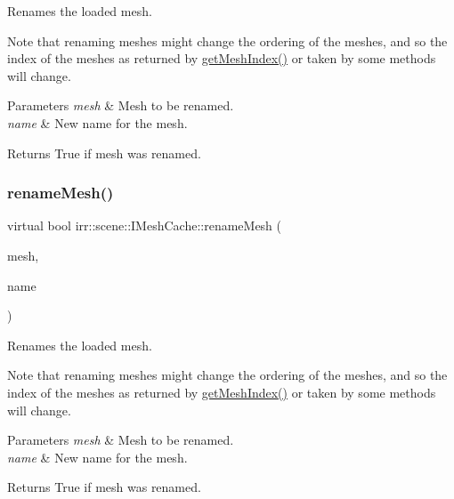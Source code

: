 Renames the loaded mesh. 

Note that renaming meshes might change the ordering of the meshes, and so the index of the meshes as returned by \hyperlink{classirr_1_1scene_1_1IMeshCache_a2b3512bd3ff11d0b290fa5d2d580eb54}{get\+Mesh\+Index()} or taken by some methods will change. 
\begin{DoxyParams}{Parameters}
{\em mesh} & Mesh to be renamed. \\
\hline
{\em name} & New name for the mesh. \\
\hline
\end{DoxyParams}
\begin{DoxyReturn}{Returns}
True if mesh was renamed. 
\end{DoxyReturn}
\mbox{\label{classirr_1_1scene_1_1IMeshCache_a4533c81f4f3df112fa106d6fb1118f3b}} 
\subsubsection{\texorpdfstring{rename\+Mesh()}{renameMesh()}\hspace{0.1cm}{\footnotesize\ttfamily [4/4]}}
{\footnotesize\ttfamily virtual bool irr\+::scene\+::\+I\+Mesh\+Cache\+::rename\+Mesh (\begin{DoxyParamCaption}\item[{const \hyperlink{classirr_1_1scene_1_1IMesh}{I\+Mesh} $\ast$const}]{mesh,  }\item[{const \hyperlink{namespaceirr_1_1io_a6468281622ce3a1c46b72e19f32dded5}{io\+::path} \&}]{name }\end{DoxyParamCaption})\hspace{0.3cm}{\ttfamily [pure virtual]}}



Renames the loaded mesh. 

Note that renaming meshes might change the ordering of the meshes, and so the index of the meshes as returned by \hyperlink{classirr_1_1scene_1_1IMeshCache_a2b3512bd3ff11d0b290fa5d2d580eb54}{get\+Mesh\+Index()} or taken by some methods will change. 
\begin{DoxyParams}{Parameters}
{\em mesh} & Mesh to be renamed. \\
\hline
{\em name} & New name for the mesh. \\
\hline
\end{DoxyParams}
\begin{DoxyReturn}{Returns}
True if mesh was renamed. 
\end{DoxyReturn}
\mbox{\label{classirr_1_1scene_1_1IMeshCache_a5b87031dbfdb70a59c00a1b892b74c3d}} 
